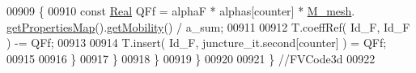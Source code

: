 \begin{DoxyCode}
00909             \{   
00910                 \textcolor{keyword}{const} \hyperlink{namespaceFVCode3D_a40c1f5588a248569d80aa5f867080e83}{Real} QFf = alphaF * alphas[counter] * \hyperlink{classFVCode3D_1_1global__Operator_a027911d0f801f6f19a3006329ec30a7f}{M\_mesh}.
      \hyperlink{classFVCode3D_1_1Rigid__Mesh_ab6e52fa6193e5db83fe7ccbb1c3737e8}{getPropertiesMap}().\hyperlink{classFVCode3D_1_1PropertiesMap_a810ea62ca881e4db57acd601bcea23cf}{getMobility}() / a\_sum;
00911                 
00912                 T.coeffRef( Id\_F, Id\_F ) -= QFf;
00913                 
00914                 T.insert( Id\_F, juncture\_it.second[counter] ) = QFf; 
00915                 
00916             \}
00917         \}
00918     \}
00919 \}
00920 
00921 \}  \textcolor{comment}{//FVCode3d}
00922 
\end{DoxyCode}
